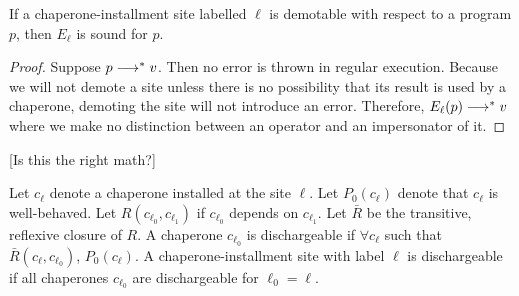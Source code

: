 \begin{theorem}
If a chaperone-installment site labelled $\ell$ is demotable with respect to a program $p$, then $E_\ell$ is sound for $p$.
\end{theorem}

\begin{proof}
Suppose $p\longrightarrow^{*} v$.
Then no error is thrown in regular execution.
Because we will not demote a site unless there is no possibility that its result is used by a chaperone, demoting the site will not introduce an error.
Therefore, $E_\ell(p)\longrightarrow^{*} v$ where we make no distinction between an operator and an impersonator of it.


\end{proof}

[Is this the right math?]

Let $c_\ell$ denote a chaperone installed at the site $\ell$.
Let $P_0(c_\ell)$ denote that $c_\ell$ is well-behaved.
Let $R(c_{\ell_0},c_{\ell_1})$ if $c_{\ell_0}$ depends on $c_{\ell_1}$.
Let $\bar{R}$ be the transitive, reflexive closure of $R$.
A chaperone $c_{\ell_0}$ is dischargeable if $\forall c_\ell$ such that $\bar{R}(c_\ell,c_{\ell_0})$, $P_0(c_\ell)$.
A chaperone-installment site with label $\ell$ is dischargeable if all chaperones $c_{\ell_0}$ are dischargeable for $\ell_0=\ell$.
